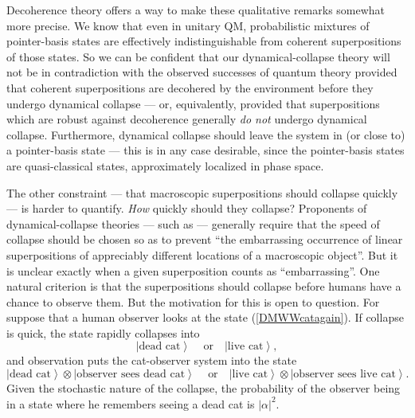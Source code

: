 \documentclass[12pt]{article}
\newcommand{\be}{\begin{equation}}
\newcommand{\ee}{\end{equation}}
\newcommand{\ket}[1]{\ensuremath{\left|  #1 \right\rangle}}
\newcommand{\tpk}[2]{\ensuremath{\ket{#1}\!\otimes\!\ket{#2}}}
\begin{document}
Decoherence theory offers a way to make these qualitative remarks somewhat more precise. We know that even in unitary QM, probabilistic mixtures of pointer-basis states are effectively indistinguishable from coherent superpositions of those states. So we can be confident that our dynamical-collapse theory will not be in contradiction with the observed successes of quantum theory provided that coherent superpositions are decohered by the environment before they undergo dynamical collapse --- or, equivalently, provided that superpositions which are robust against decoherence generally \emph{do not} undergo dynamical collapse. Furthermore, dynamical collapse should leave the system in (or close to) a pointer-basis state --- this is in any case desirable, since the pointer-basis states are quasi-classical states, approximately localized in phase space.

The other constraint --- that macroscopic superpositions should collapse quickly --- is harder to quantify. \emph{How} quickly should they collapse? Proponents of dynamical-collapse theories --- such as \cite{bassighirardireview} --- generally require that the speed of collapse should be chosen so as to prevent ``the embarrassing occurrence of linear superpositions of appreciably different locations of a macroscopic object''. But it is unclear exactly when a given superposition counts as ``embarrassing''. One natural criterion is that the superpositions should collapse before humans have a chance to observe them. But the motivation for this is open to question. For suppose that a human observer looks at the state (\ref{DMWWcatagain}). If collapse is quick, the state rapidly collapses into
\be \ket{\mathrm{\mbox{dead cat}}} \,\,\,\,\,\,\,\mathrm{\mbox{or}}\,\,\,\,\,\, \ket{\mathrm{\mbox{live cat}}},
\ee
and observation puts the cat-observer system into the state
\be
\tpk{\mathrm{\mbox{dead cat}}}{\mathrm{\mbox{observer sees dead cat}}}\,\,\,\,\,\,\,\mathrm{\mbox{or}}\,\,\,\,\,\, 
\tpk{\mathrm{\mbox{live cat}}}{\mathrm{\mbox{observer sees live cat}}}.
\ee
Given the stochastic nature of the collapse, the probability of the observer being in a state where he remembers seeing a dead cat is $|\alpha|^2$.
\end{document}
